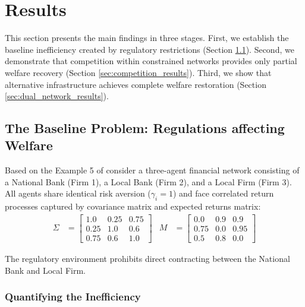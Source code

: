 \documentclass[12pt]{article}
\begin{document}
\section{Results}
\label{sec:results}

This section presents the main findings in three stages. First, we establish the baseline inefficiency created by regulatory restrictions (Section \ref{sec:baseline_problem}). Second, we demonstrate that competition within constrained networks provides only partial welfare recovery (Section \ref{sec:competition_results}). Third, we show that alternative infrastructure achieves complete welfare restoration (Section \ref{sec:dual_network_results}).

\subsection{The Baseline Problem: Regulations affecting Welfare}
\label{sec:baseline_problem}

Based on the Example 5 of \citet{jalan_incentive-aware_2024} consider a three-agent financial network consisting of a National Bank (Firm 1), a Local Bank (Firm 2), and a Local Firm (Firm 3). All agents share identical risk aversion ($\gamma_i = 1$) and face correlated return processes captured by covariance matrix and expected returns matrix:
\begin{align}
\Sigma &= \begin{bmatrix} 
    1.0 & 0.25 & 0.75 \\ 
    0.25 & 1.0 & 0.6 \\ 
    0.75 & 0.6 & 1.0 
\end{bmatrix} &
M &= \begin{bmatrix} 
    0.0 & 0.9 & 0.9 \\ 
    0.75 & 0.0 & 0.95 \\ 
    0.5 & 0.8 & 0.0 
\end{bmatrix}
\end{align}

The regulatory environment prohibits direct contracting between the National Bank and Local Firm.

\subsubsection{Quantifying the Inefficiency}
\end{document}

